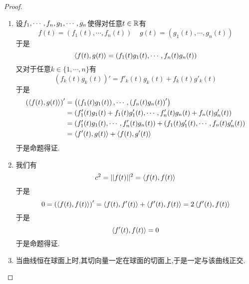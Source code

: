 \documentclass{ctexart}
\begin{document}
\begin{proof}
    \begin{enumerate}[label=\tbf{(\arabic*)}]
        \item 设${f}_1,\cdots,{f}_{n},{g}_1,\cdots,{g}_{n}$使得对任意$t\in\mathbb{R}$有
            \[f(t)=\left(f_1(t),\cdots,f_n(t)\right)\ \ \ \ \ g(t)=\left(g_1(t),\cdots,g_n(t)\right)\]
            于是
            \[\left\langle{f(t)},{g(t)}\right\rangle=\left(f_1(t)g_1(t),\cdots,f_n(t)g_n(t)\right)\]
            又对于任意$k\in\{1,\cdots,n\}$有
            \[\left(f_k(t)g_k(t)\right)'=f'_k(t)g_k(t)+f_k(t)g'_k(t)\]
            于是
            \[\begin{aligned}
                \left(\left\langle{f(t)},{g(t)}\right\rangle\right)'
                &= \left(\left(f_1(t)g_1(t)\right),\cdots,\left(f_n(t)g_n(t)\right)'\right) \\
                &= \left(f'_1(t)g_1(t)+f_1(t)g'_1(t),\cdots,f'_n(t)g_n(t)+f_n(t)g'_n(t)\right) \\
                &= \left(f'_1(t)g_1(t),\cdots,f'_n(t)g_n(t)\right)+\left(f_1(t)g'_1(t),\cdots,f_n(t)g'_n(t)\right) \\
                &= \left\langle{f'(t)},{g(t)}\right\rangle+\left\langle{f(t)},{g'(t)}\right\rangle
            \end{aligned}\]
            于是命题得证.
        \item 我们有
            \[c^2=||f(t)||^2=\left\langle{f(t)},{f(t)}\right\rangle\]
            于是
            \[0=\left(\left\langle{f(t)},{f(t)}\right\rangle\right)'=\left\langle{f(t)},{f'(t)}\right\rangle+\left\langle{f'(t)},{f(t)}\right\rangle=2\left\langle{f'(t)},{f(t)}\right\rangle\]
            于是
            \[\left\langle{f'(t)},{f(t)}\right\rangle=0\]
            于是命题得证.
        \item 当曲线恒在球面上时,其切向量一定在球面的切面上,于是一定与该曲线正交.
    \end{enumerate}
\end{proof}
\end{document}
